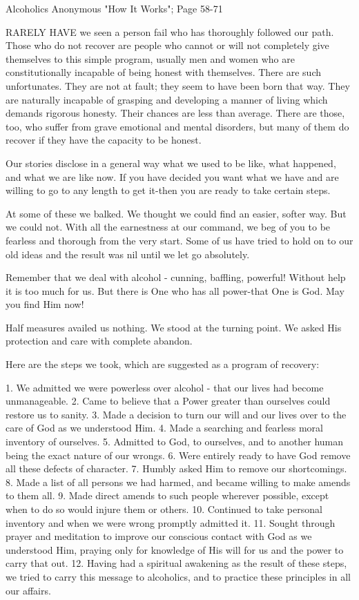 
Alcoholics Anonymous "How It Works"; Page 58-71

\begin{biblechapter}
RARELY HAVE we seen a person fail who has thoroughly followed our path.  Those who do not recover are people who cannot or will not completely give themselves to this simple program, usually men and women who are constitutionally incapable of being honest with themselves.  There are such unfortunates.  They are not at fault; they seem to have been born that way.  They are naturally incapable of grasping and developing a manner of living which demands rigorous honesty.  Their chances are less than average.  There are those, too, who suffer from grave emotional and mental disorders, but many of them do recover if they have the capacity to be honest.

Our stories disclose in a general way what we used to be like, what happened, and what we are like now. If you have decided you want what we have and are willing to go to any length to get it-then you are ready to take certain steps.

At some of these we balked.  We thought we could find an easier, softer way.  But we could not.  With all the earnestness at our command, we beg of you to be fearless and thorough from the very start.  Some of us have tried to hold on to our old ideas and the result was nil until we let go absolutely.

Remember that we deal with alcohol - cunning, baffling, powerful!  Without help it is too much for us.  But there is One who has all power-that One is God.  May you find Him now!

Half measures availed us nothing.  We stood at the turning point.  We asked His protection and care with complete abandon.

Here are the steps we took, which are suggested as a program of recovery:

1. We admitted we were powerless over alcohol - that our lives had become unmanageable.
2. Came to believe that a Power greater than ourselves could restore us to sanity.
3. Made a decision to turn our will and our lives over to the care of God as we understood Him.
4. Made a searching and fearless moral inventory of ourselves.
5. Admitted to God, to ourselves, and to another human being the exact nature of our wrongs.
6. Were entirely ready to have God remove all these defects of character.
7. Humbly asked Him to remove our shortcomings.
8. Made a list of all persons we had harmed, and became willing to make amends to them all.
9. Made direct amends to such people wherever possible, except when to do so would injure them or others.
10. Continued to take personal inventory and when we were wrong promptly admitted it.
11. Sought through prayer and meditation to improve our conscious contact with God as we understood Him, praying only for knowledge of His will for us and the power to carry that out.
12. Having had a spiritual awakening as the result of these steps, we tried to carry this message to alcoholics, and to practice these principles in all our affairs.


\end{biblechapter}
